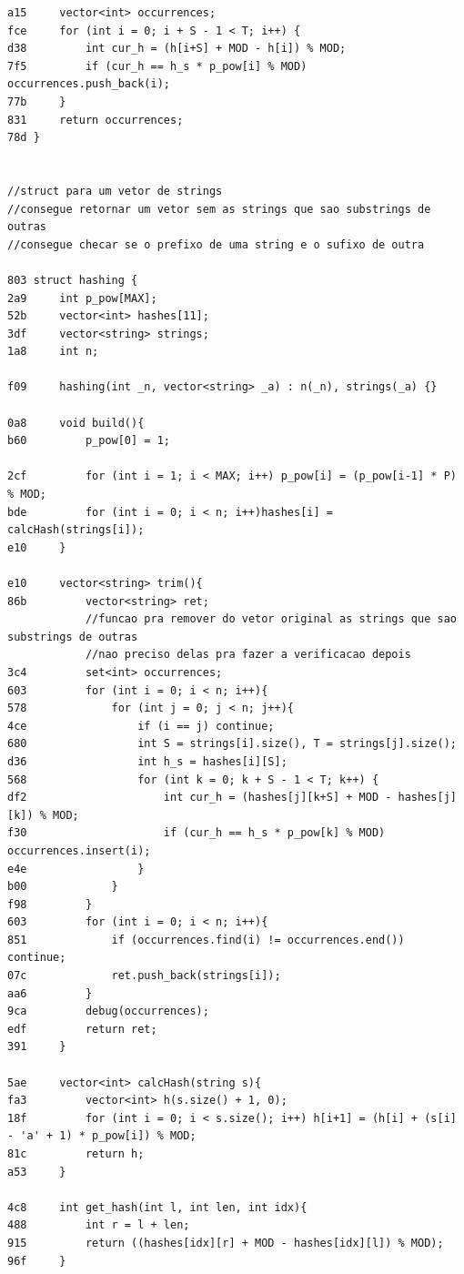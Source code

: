 \documentclass[11pt, a4paper, twoside]{article}
\begin{document}
{\begin{lstlisting}
a15     vector<int> occurrences;
fce     for (int i = 0; i + S - 1 < T; i++) {
d38         int cur_h = (h[i+S] + MOD - h[i]) % MOD;
7f5         if (cur_h == h_s * p_pow[i] % MOD) occurrences.push_back(i);
77b     }
831     return occurrences;
78d }


//struct para um vetor de strings
//consegue retornar um vetor sem as strings que sao substrings de outras
//consegue checar se o prefixo de uma string e o sufixo de outra

803 struct hashing {
2a9     int p_pow[MAX]; 
52b     vector<int> hashes[11];
3df     vector<string> strings;
1a8     int n;
        
f09     hashing(int _n, vector<string> _a) : n(_n), strings(_a) {} 
    
0a8     void build(){
b60         p_pow[0] = 1; 
    
2cf         for (int i = 1; i < MAX; i++) p_pow[i] = (p_pow[i-1] * P) % MOD;
bde         for (int i = 0; i < n; i++)hashes[i] = calcHash(strings[i]);
e10     }
    
e10     vector<string> trim(){
86b         vector<string> ret;
            //funcao pra remover do vetor original as strings que sao substrings de outras
            //nao preciso delas pra fazer a verificacao depois
3c4         set<int> occurrences;
603         for (int i = 0; i < n; i++){
578             for (int j = 0; j < n; j++){
4ce                 if (i == j) continue;
680                 int S = strings[i].size(), T = strings[j].size();
d36                 int h_s = hashes[i][S];
568                 for (int k = 0; k + S - 1 < T; k++) {
df2                     int cur_h = (hashes[j][k+S] + MOD - hashes[j][k]) % MOD;
f30                     if (cur_h == h_s * p_pow[k] % MOD) occurrences.insert(i);
e4e                 }
b00             }
f98         }
603         for (int i = 0; i < n; i++){
851             if (occurrences.find(i) != occurrences.end()) continue;
07c             ret.push_back(strings[i]);
aa6         }
9ca         debug(occurrences);
edf         return ret;
391     }
        
5ae     vector<int> calcHash(string s){
fa3         vector<int> h(s.size() + 1, 0); 
18f         for (int i = 0; i < s.size(); i++) h[i+1] = (h[i] + (s[i] - 'a' + 1) * p_pow[i]) % MOD;
81c         return h;
a53     }
        
4c8     int get_hash(int l, int len, int idx){
488         int r = l + len;
915         return ((hashes[idx][r] + MOD - hashes[idx][l]) % MOD);
96f     }
    

\end{lstlisting}}
\end{document}
